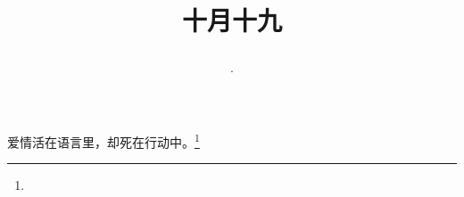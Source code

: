 \title{\date[d=19,m=11,y=2024][year:cn-y,年,month:cn,day:cn,日,·,weekday]·十月十九 }
爱情活在语言里，却死在行动中。\footnote{ }

